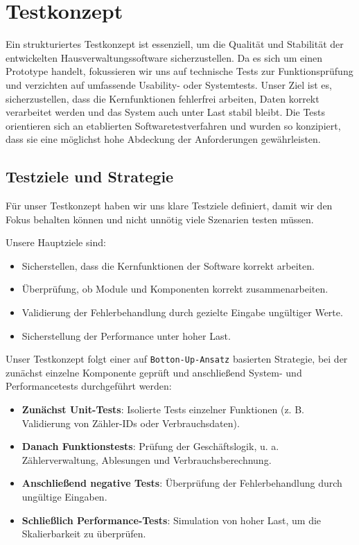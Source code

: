 \section{Testkonzept}\label{Testkonzept}

Ein strukturiertes Testkonzept ist essenziell, um die Qualität und Stabilität der entwickelten Hausverwaltungssoftware sicherzustellen.  
Da es sich um einen Prototype handelt, fokussieren wir uns auf technische Tests zur Funktionsprüfung und verzichten auf umfassende Usability- oder Systemtests.  
Unser Ziel ist es, sicherzustellen, dass die Kernfunktionen fehlerfrei arbeiten, Daten korrekt verarbeitet werden und das System auch unter Last stabil bleibt.  
Die Tests orientieren sich an etablierten Softwaretestverfahren und wurden so konzipiert, dass sie eine möglichst hohe Abdeckung der Anforderungen gewährleisten.\par

\subsection{Testziele und Strategie}

Für unser Testkonzept haben wir uns klare Testziele definiert, damit wir den Fokus behalten können und nicht unnötig viele Szenarien testen müssen.\par
Unsere Hauptziele sind:
\begin{itemize}
	\item Sicherstellen, dass die Kernfunktionen der Software korrekt arbeiten.
	\item Überprüfung, ob Module und Komponenten korrekt zusammenarbeiten.
	\item Validierung der Fehlerbehandlung durch gezielte Eingabe ungültiger Werte.
	\item Sicherstellung der Performance unter hoher Last.
\end{itemize}

Unser Testkonzept folgt einer auf \texttt{Botton-Up-Ansatz} basierten Strategie, bei der zunächst einzelne Komponente geprüft und anschließend System- und Performancetests durchgeführt werden:\par
\begin{itemize}
	\item \textbf{Zunächst Unit-Tests}: Isolierte Tests einzelner Funktionen (z. B. Validierung von Zähler-IDs oder Verbrauchsdaten).
	\item \textbf{Danach Funktionstests}: Prüfung der Geschäftslogik, u. a. Zählerverwaltung, Ablesungen und Verbrauchsberechnung.
	\item \textbf{Anschließend negative Tests}: Überprüfung der Fehlerbehandlung durch ungültige Eingaben.
	\item \textbf{Schließlich Performance-Tests}: Simulation von hoher Last, um die Skalierbarkeit zu überprüfen.
\end{itemize}

